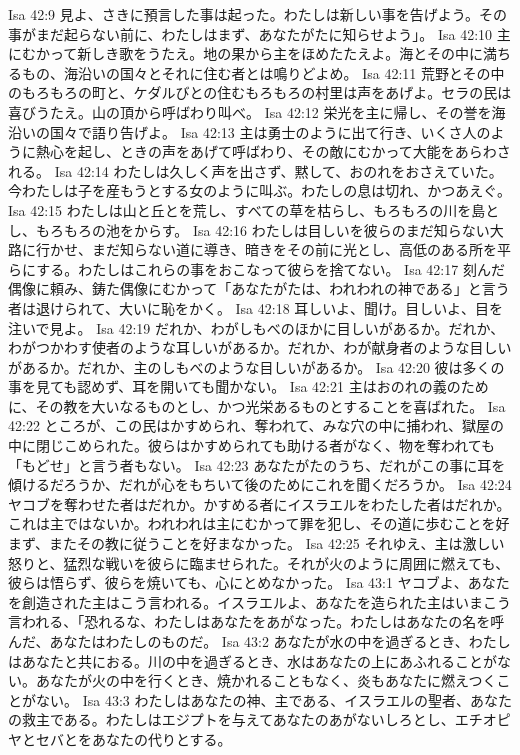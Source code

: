 Isa 42:9  見よ、さきに預言した事は起った。わたしは新しい事を告げよう。その事がまだ起らない前に、わたしはまず、あなたがたに知らせよう」。
Isa 42:10  主にむかって新しき歌をうたえ。地の果から主をほめたたえよ。海とその中に満ちるもの、海沿いの国々とそれに住む者とは鳴りどよめ。
Isa 42:11  荒野とその中のもろもろの町と、ケダルびとの住むもろもろの村里は声をあげよ。セラの民は喜びうたえ。山の頂から呼ばわり叫べ。
Isa 42:12  栄光を主に帰し、その誉を海沿いの国々で語り告げよ。
Isa 42:13  主は勇士のように出て行き、いくさ人のように熱心を起し、ときの声をあげて呼ばわり、その敵にむかって大能をあらわされる。
Isa 42:14  わたしは久しく声を出さず、黙して、おのれをおさえていた。今わたしは子を産もうとする女のように叫ぶ。わたしの息は切れ、かつあえぐ。
Isa 42:15  わたしは山と丘とを荒し、すべての草を枯らし、もろもろの川を島とし、もろもろの池をからす。
Isa 42:16  わたしは目しいを彼らのまだ知らない大路に行かせ、まだ知らない道に導き、暗きをその前に光とし、高低のある所を平らにする。わたしはこれらの事をおこなって彼らを捨てない。
Isa 42:17  刻んだ偶像に頼み、鋳た偶像にむかって「あなたがたは、われわれの神である」と言う者は退けられて、大いに恥をかく。
Isa 42:18  耳しいよ、聞け。目しいよ、目を注いで見よ。
Isa 42:19  だれか、わがしもべのほかに目しいがあるか。だれか、わがつかわす使者のような耳しいがあるか。だれか、わが献身者のような目しいがあるか。だれか、主のしもべのような目しいがあるか。
Isa 42:20  彼は多くの事を見ても認めず、耳を開いても聞かない。
Isa 42:21  主はおのれの義のために、その教を大いなるものとし、かつ光栄あるものとすることを喜ばれた。
Isa 42:22  ところが、この民はかすめられ、奪われて、みな穴の中に捕われ、獄屋の中に閉じこめられた。彼らはかすめられても助ける者がなく、物を奪われても「もどせ」と言う者もない。
Isa 42:23  あなたがたのうち、だれがこの事に耳を傾けるだろうか、だれが心をもちいて後のためにこれを聞くだろうか。
Isa 42:24  ヤコブを奪わせた者はだれか。かすめる者にイスラエルをわたした者はだれか。これは主ではないか。われわれは主にむかって罪を犯し、その道に歩むことを好まず、またその教に従うことを好まなかった。
Isa 42:25  それゆえ、主は激しい怒りと、猛烈な戦いを彼らに臨ませられた。それが火のように周囲に燃えても、彼らは悟らず、彼らを焼いても、心にとめなかった。
Isa 43:1  ヤコブよ、あなたを創造された主はこう言われる。イスラエルよ、あなたを造られた主はいまこう言われる、「恐れるな、わたしはあなたをあがなった。わたしはあなたの名を呼んだ、あなたはわたしのものだ。
Isa 43:2  あなたが水の中を過ぎるとき、わたしはあなたと共におる。川の中を過ぎるとき、水はあなたの上にあふれることがない。あなたが火の中を行くとき、焼かれることもなく、炎もあなたに燃えつくことがない。
Isa 43:3  わたしはあなたの神、主である、イスラエルの聖者、あなたの救主である。わたしはエジプトを与えてあなたのあがないしろとし、エチオピヤとセバとをあなたの代りとする。
